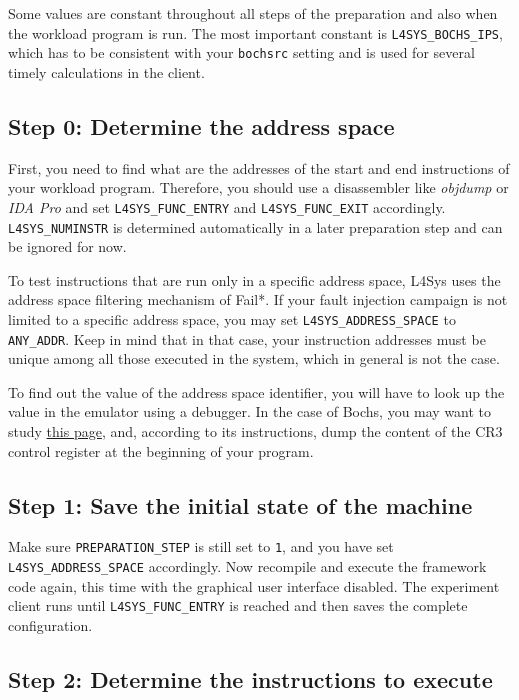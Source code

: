 \documentclass[a4paper,10pt]{article}
\begin{document}
Some values are constant throughout all steps of the preparation
and also when the workload program is run.
The most important constant is \verb+L4SYS_BOCHS_IPS+,
which has to be consistent with your \texttt{bochsrc} setting
and is used for several timely calculations in the client.

\subsection{Step 0: Determine the address space}

First, you need to find what are the addresses of the
start and end instructions of your
workload program. Therefore, you should use a
disassembler like \emph{objdump} or \emph{IDA Pro} and
set \verb+L4SYS_FUNC_ENTRY+ and \verb+L4SYS_FUNC_EXIT+
accordingly. \verb+L4SYS_NUMINSTR+
is determined automatically in a later preparation step and
can be ignored for now.

To test instructions that are run only in a specific address space,
L4Sys uses the address space filtering mechanism of Fail*.
If your fault injection campaign is not limited to a specific address space,
you may set \verb+L4SYS_ADDRESS_SPACE+ to \verb+ANY_ADDR+. Keep in mind that in
that case, your instruction addresses must be unique among all those
executed in the system, which in general is not the case.

To find out the value of the address space identifier, you will have to
look up the value in
the emulator using a debugger. In the case of Bochs, you may want to
study
\href{http://bochs.sourceforge.net/doc/docbook/user/internal-debugger.html}{this page},
and, according to its instructions,
dump the content of the CR3 control register at the
beginning of your program.

\subsection{Step 1: Save the initial state of the machine}

Make sure \verb+PREPARATION_STEP+ is still set to \texttt{1}, and
you have set \verb+L4SYS_ADDRESS_SPACE+ accordingly.
Now recompile and execute the framework code again, this time with the graphical
user interface disabled. The experiment client runs until
\verb+L4SYS_FUNC_ENTRY+ is reached and then saves
the complete configuration.

\subsection{Step 2: Determine the instructions to execute}
\end{document}
